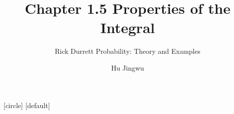 [circle]
[default]

\usepackage{amsmath,amssymb,mathtools}

\newcommand{\OmegaSpace}{\Omega}
\newcommand{\F}{\mathcal{F}}
\newcommand{\R}{\mathbb{R}}
\newcommand{\N}{\mathbb{N}}
\newcommand{\Prob}{\mathbb{P}}
\newcommand{\E}{\mathbb{E}}
\newcommand{\one}{\mathbf{1}}
\newcommand{\eps}{\varepsilon}
\newcommand{\norm}[1]{\left\lVert #1\right\rVert}
\newcommand{\vikiname}[1]{\par\smallskip{\scriptsize\color{blue!60!black}\textbf{LLMwiki:} \texttt{\detokenize{#1}}}}
\newcommand{\blankproof}{%
  \vspace{2mm}
  {\color{gray!55}\rule{\linewidth}{0.4pt}}\par\vspace{5mm}
  {\color{gray!55}\rule{\linewidth}{0.4pt}}\par\vspace{5mm}
  {\color{gray!55}\rule{\linewidth}{0.4pt}}\par\vspace{5mm}
  {\color{gray!55}\rule{\linewidth}{0.4pt}}\par
}
\newcommand{\longblankproof}{%
  \vspace{1mm}
  {\color{gray!55}\rule{\linewidth}{0.4pt}}\par\vspace{4mm}
  {\color{gray!55}\rule{\linewidth}{0.4pt}}\par\vspace{4mm}
  {\color{gray!55}\rule{\linewidth}{0.4pt}}\par\vspace{4mm}
  {\color{gray!55}\rule{\linewidth}{0.4pt}}\par\vspace{4mm}
  {\color{gray!55}\rule{\linewidth}{0.4pt}}\par\vspace{4mm}
  {\color{gray!55}\rule{\linewidth}{0.4pt}}\par
}
\newcommand{\proofblock}[1]{\ifteacher #1 \else \blankproof \fi}
\newcommand{\longproofblock}[1]{\ifteacher #1 \else \longblankproof \fi}

\title[Chapter 1.5]{Chapter 1.5 Properties of the Integral}
\subtitle{Rick Durrett Probability: Theory and Examples}
\author{Hu Jingwu}
\date{}



